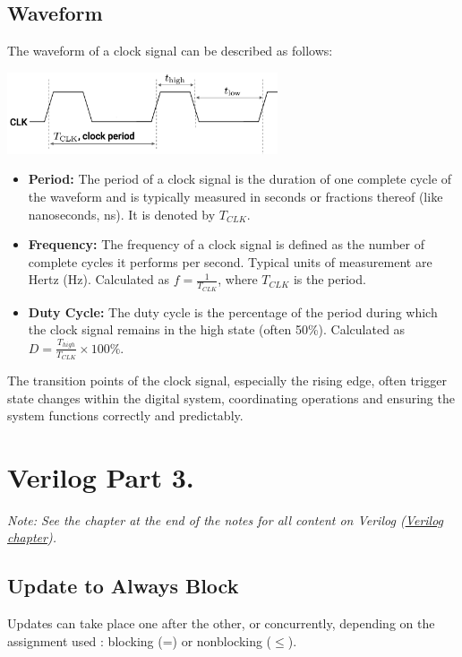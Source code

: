\documentclass[12pt,openany]{book}
\begin{document}
\subsection{Waveform}
The waveform of a clock signal can be described as follows:
\begin{center}
	\includegraphics[width=0.6\textwidth]{circuits/12.3.2.png}
\end{center}
\justify
\begin{itemize}
    \item \textbf{Period:} The period of a clock signal is the duration of one complete cycle of the waveform and is typically measured in seconds or fractions thereof (like nanoseconds, ns). \newline It is denoted by $T_{CLK}$.
    \item \textbf{Frequency:} The frequency of a clock signal is defined as the number of complete cycles it performs per second. Typical units of measurement are Hertz (Hz). \newline Calculated as $f = \frac{1}{T_{CLK}}$, where $T_{CLK}$ is the period.
    \item \textbf{Duty Cycle:} The duty cycle is the percentage of the period during which the clock signal remains in the high state (often 50\%). Calculated as $D = \frac{T_{high}}{T_{CLK}} \times 100\%$.
\end{itemize}



\begin{justify}
	The transition points of the clock signal, especially the rising edge, often trigger state changes within the digital system, coordinating operations and ensuring the system functions correctly and predictably.
\end{justify}

\section{Verilog Part 3.}
 \textit{Note: See the chapter at the end of the notes for all content on Verilog (\hyperref[Verilog]{Verilog chapter}).}

\subsection{Update to Always Block}
Updates can take place one after the other, or concurrently, depending on the assignment used : blocking (=) or nonblocking ($\leq$). \newline
\vspace*{-20px}
\end{document}
